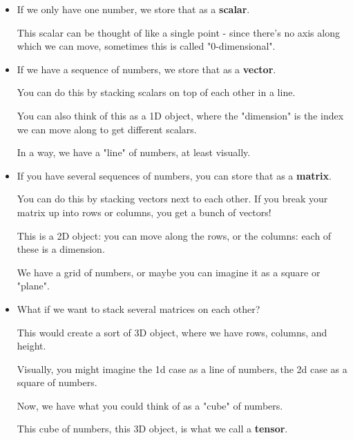         \begin{itemize}
            \item If we only have one number, we store that as a \textbf{scalar}.
            
                This scalar can be thought of like a single point - since there's no axis along which we can move, sometimes this is called "0-dimensional".
            
            \item If we have a sequence of numbers, we store that as a \textbf{vector}.
            
                You can do this by stacking scalars on top of each other in a line.
                
                You can also think of this as a 1D object, where the "dimension" is the index we can move along to get different scalars. 
                
                In a way, we have a "line" of numbers, at least visually.
            
            \item If you have several sequences of numbers, you can store that as a \textbf{matrix}.
            
                You can do this by stacking vectors next to each other. If you break your matrix up into rows or columns, you get a bunch of vectors!
                
                This is a 2D object: you can move along the rows, or the columns: each of these is a dimension. 
                
                We have a grid of numbers, or maybe you can imagine it as a square or "plane".
            
            \item What if we want to stack several matrices on each other?
            
                This would create a sort of 3D object, where we have rows, columns, and height.
                
                Visually, you might imagine the 1d case as a line of numbers, the 2d case as a square of numbers. 
                
                Now, we have what you could think of as a "cube" of numbers.
                
                This cube of numbers, this 3D object, is what we call a \textbf{tensor}.
        \end{itemize}
        
